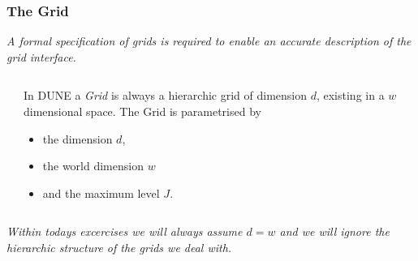 \documentclass[ignorenonframetext,11pt]{beamer}
\theoremstyle{definition}
\begin{document}
\begin{frame}
  \frametitle{The Grid}
  \emph{A formal specification of grids is required to enable an
  accurate description of the grid interface.}
  \begin{columns}
    \begin{column}{0.33\linewidth}
    \end{column}\hfill
    \begin{column}{0.6\linewidth}
      In DUNE a \emph{Grid} is always a hierarchic grid of dimension
      $d$, existing in a $w$ dimensional
      space. 
      The Grid is parametrised by
      \begin{itemize}
      \item the dimension $d$,
      \item the world dimension $w$
      \item and the maximum level $J$.
      \end{itemize}
    \end{column}
  \end{columns}
  \pause
  \vspace*{5mm}
  \emph{Within todays excercises we will always assume $d=w$ and we will
    ignore the hierarchic structure of the grids we deal with.}
\end{frame}
\end{document}
